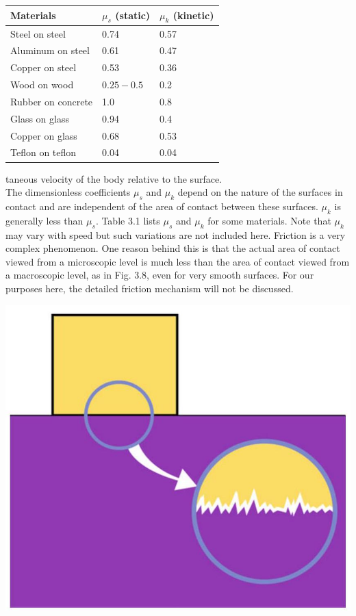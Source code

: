 \documentclass[10pt]{article}
\begin{document}
\begin{center}
\begin{tabular}{l|l|l}
\hline
Materials & $\mu_{s}$ (static) & $\mu_{k}$ (kinetic) \\
\hline
Steel on steel & 0.74 & 0.57 \\
\hline
Aluminum on steel & 0.61 & 0.47 \\
\hline
Copper on steel & 0.53 & 0.36 \\
\hline
Wood on wood & $0.25-0.5$ & 0.2 \\
\hline
Rubber on concrete & 1.0 & 0.8 \\
\hline
Glass on glass & 0.94 & 0.4 \\
\hline
Copper on glass & 0.68 & 0.53 \\
\hline
Teflon on teflon & 0.04 & 0.04 \\
\hline
\end{tabular}
\end{center}

taneous velocity of the body relative to the surface.\\
The dimensionless coefficients $\mu_{s}$ and $\mu_{k}$ depend on the nature of the surfaces in contact and are independent of the area of contact between these surfaces. $\mu_{k}$ is generally less than $\mu_{s}$. Table 3.1 lists $\mu_{s}$ and $\mu_{k}$ for some materials. Note that $\mu_{k}$ may vary with speed but such variations are not included here. Friction is a very complex phenomenon. One reason behind this is that the actual area of contact viewed from a microscopic level is much less than the area of contact viewed from a macroscopic level, as in Fig. 3.8, even for very smooth surfaces. For our purposes here, the detailed friction mechanism will not be discussed.

\begin{center}
\includegraphics[max width=\textwidth]{2024_09_13_db1f357d2aad0a03eb2eg-053(2)}
\end{center}
\end{document}
